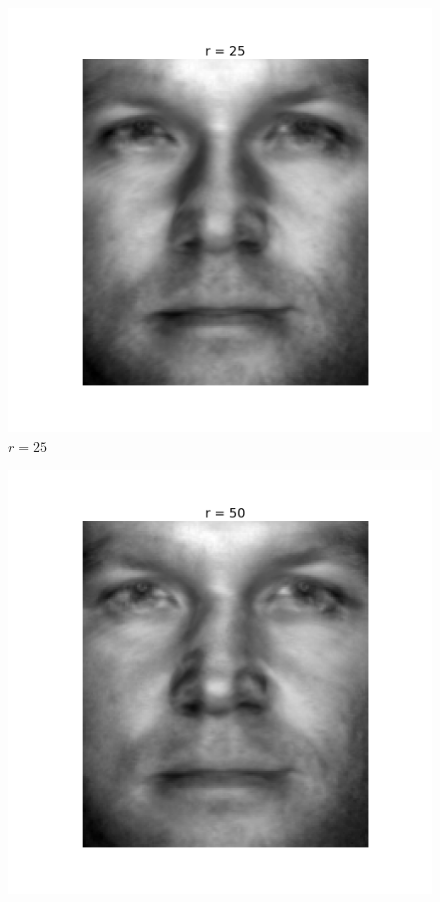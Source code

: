 \begin{enumerate}[label=\arabic*.]
\begin{mdframed}[style=MyFrame]
\begin{figure}[H]
                    \includegraphics[height=0.35\textheight]{../media/r-25-1.png}
                    \caption{$r=25$}
                \end{figure}
                \begin{figure}[H]
                    \includegraphics[height=0.35\textheight]{../media/r-50-1.png}

\end{figure}
\end{mdframed}
\end{enumerate}
